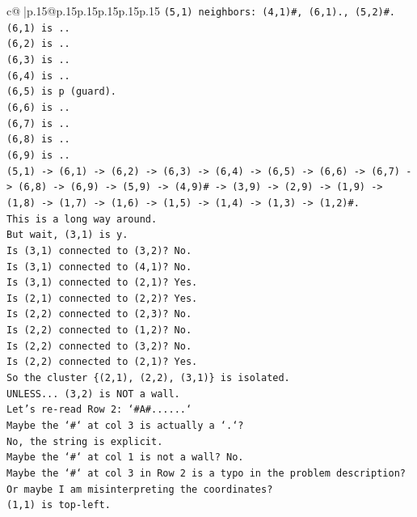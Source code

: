 \documentclass{article}
\begin{document}
{\begin{supertabular}{c@{$\;$}|p{.15\linewidth}@{}p{.15\linewidth}p{.15\linewidth}p{.15\linewidth}p{.15\linewidth}p{.15\linewidth}}
{{{\texttt{(5,1) neighbors: (4,1)\#, (6,1)., (5,2)\#.} \\
\texttt{(6,1) is ..} \\
\texttt{(6,2) is ..} \\
\texttt{(6,3) is ..} \\
\texttt{(6,4) is ..} \\
\texttt{(6,5) is p (guard).} \\
\texttt{(6,6) is ..} \\
\texttt{(6,7) is ..} \\
\texttt{(6,8) is ..} \\
\texttt{(6,9) is ..} \\
\texttt{(5,1) {-}> (6,1) {-}> (6,2) {-}> (6,3) {-}> (6,4) {-}> (6,5) {-}> (6,6) {-}> (6,7) {-}> (6,8) {-}> (6,9) {-}> (5,9) {-}> (4,9)\# {-}> (3,9) {-}> (2,9) {-}> (1,9) {-}> (1,8) {-}> (1,7) {-}> (1,6) {-}> (1,5) {-}> (1,4) {-}> (1,3) {-}> (1,2)\#.} \\
\texttt{This is a long way around.} \\
\texttt{But wait, (3,1) is y.} \\
\texttt{Is (3,1) connected to (3,2)? No.} \\
\texttt{Is (3,1) connected to (4,1)? No.} \\
\texttt{Is (3,1) connected to (2,1)? Yes.} \\
\texttt{Is (2,1) connected to (2,2)? Yes.} \\
\texttt{Is (2,2) connected to (2,3)? No.} \\
\texttt{Is (2,2) connected to (1,2)? No.} \\
\texttt{Is (2,2) connected to (3,2)? No.} \\
\texttt{Is (2,2) connected to (2,1)? Yes.} \\
\texttt{So the cluster \{(2,1), (2,2), (3,1)\} is isolated.} \\
\texttt{UNLESS... (3,2) is NOT a wall.} \\
\texttt{Let's re{-}read Row 2: `\#A\#......`} \\
\texttt{Maybe the `\#` at col 3 is actually a `.`?} \\
\texttt{No, the string is explicit.} \\
\texttt{Maybe the `\#` at col 1 is not a wall? No.} \\
\texttt{Maybe the `\#` at col 3 in Row 2 is a typo in the problem description?} \\
\texttt{Or maybe I am misinterpreting the coordinates?} \\
\texttt{(1,1) is top{-}left.} \\
}}}
\end{supertabular}}
\end{document}
